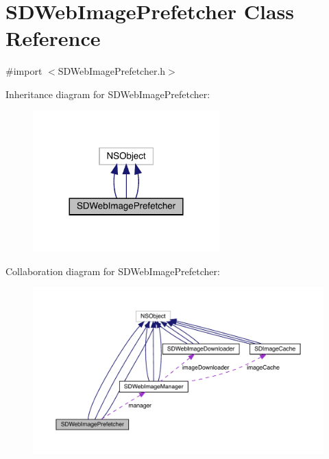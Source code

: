 \hypertarget{interface_s_d_web_image_prefetcher}{}\section{S\+D\+Web\+Image\+Prefetcher Class Reference}
\label{interface_s_d_web_image_prefetcher}


{\ttfamily \#import $<$S\+D\+Web\+Image\+Prefetcher.\+h$>$}



Inheritance diagram for S\+D\+Web\+Image\+Prefetcher\+:\nopagebreak
\begin{figure}[H]
\begin{center}
\leavevmode
\includegraphics[width=204pt]{interface_s_d_web_image_prefetcher__inherit__graph}
\end{center}
\end{figure}


Collaboration diagram for S\+D\+Web\+Image\+Prefetcher\+:\nopagebreak
\begin{figure}[H]
\begin{center}
\leavevmode
\includegraphics[width=350pt]{interface_s_d_web_image_prefetcher__coll__graph}
\end{center}
\end{figure}
